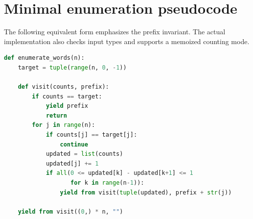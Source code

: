 \documentclass[11pt]{article}
\theoremstyle{definition}
\begin{document}
\section{Minimal enumeration pseudocode}
The following equivalent form emphasizes the prefix invariant. The actual
implementation also checks input types and supports a memoized counting mode.
\begin{lstlisting}[language=Python]
def enumerate_words(n):
    target = tuple(range(n, 0, -1))

    def visit(counts, prefix):
        if counts == target:
            yield prefix
            return
        for j in range(n):
            if counts[j] == target[j]:
                continue
            updated = list(counts)
            updated[j] += 1
            if all(0 <= updated[k] - updated[k+1] <= 1
                   for k in range(n-1)):
                yield from visit(tuple(updated), prefix + str(j))

    yield from visit((0,) * n, "")
\end{lstlisting}

\clearpage


\end{document}
